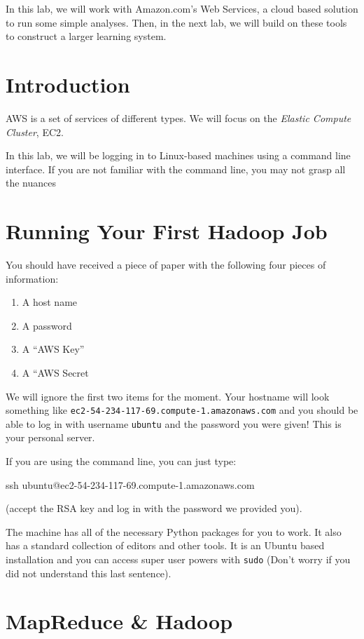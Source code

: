 In this lab, we will work with Amazon.com's Web Services, a cloud based solution
to run some simple analyses. Then, in the next lab, we will build on these
tools to construct a larger learning system.

\section{Introduction}

AWS is a set of services of different types. We will focus on the \emph{Elastic
Compute Cluster}, EC2.

In this lab, we will be logging in to Linux-based machines using a command line
interface. If you are not familiar with the command line, you may not grasp all
the nuances

\section{Running Your First Hadoop Job}

You should have received a piece of paper with the following four pieces of
information:

\begin{enumerate}
\item A host name
\item A password
\item A ``AWS Key''
\item A ``AWS Secret
\end{enumerate}

We will ignore the first two items for the moment.  Your hostname will look
something like \texttt{ec2-54-234-117-69.compute-1.amazonaws.com} and you
should be able to log in with username \texttt{ubuntu} and the password you
were given! This is your personal server.

If you are using the command line, you can just type:

ssh ubuntu@ec2-54-234-117-69.compute-1.amazonaws.com

(accept the RSA key and log in with the password we provided you).

The machine has all of the necessary Python packages for you to work. It also
has a standard collection of editors and other tools. It is an Ubuntu based
installation and you can access super user powers with \texttt{sudo} (Don't
worry if you did not understand this last sentence).


\section{MapReduce \& Hadoop}

